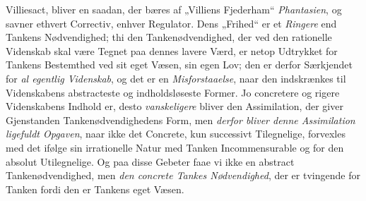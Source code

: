 \documentclass[12pt,a4paper]{book}
\begin{document}
Villiesact, bliver en saadan, der bæres af „Villiens Fjederham“ \emph{Phantasien}, og savner
ethvert Correctiv, enhver Regulator. Dens „Frihed“ er et \emph{Ringere} end Tankens Nødvendighed;
thi den Tankenødvendighed, der ved den rationelle Videnskab skal være Tegnet paa dennes
lavere Værd, er netop Udtrykket for Tankens Bestemthed ved sit eget Væsen, sin egen Lov;
den er derfor Særkjendet for \emph{al egentlig Videnskab}, og det er en
\emph{Misforstaaelse}, naar den indskrænkes til Videnskabens abstracteste og
indholdsløseste Former. Jo concretere og rigere Videnskabens Indhold er, desto \emph{vanskeligere} bliver den Assimilation, der giver Gjenstanden Tankenødvendighedens Form, men \emph{derfor bliver denne Assimilation ligefuldt Opgaven}, naar ikke det Concrete, kun successivt
Tilegnelige, forvexles med det ifølge sin irrationelle Natur med Tanken Incommensurable og
for den absolut Utilegnelige. Og paa disse Gebeter faae vi ikke en abstract
Tankenødvendighed, men \emph{den concrete Tankes Nødvendighed}, der er tvingende for Tanken fordi den er Tankens eget Væsen.
\end{document}
